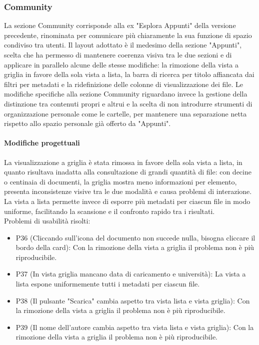 \subsubsection{Community}
La sezione Community corrisponde alla ex "Esplora Appunti" della versione
precedente, rinominata per comunicare più chiaramente la sua funzione di spazio condiviso tra utenti. Il layout adottato è il medesimo della sezione "Appunti", scelta che ha permesso di mantenere coerenza visiva tra le due sezioni e di applicare in parallelo alcune delle stesse modifiche: la rimozione della vista a griglia in favore della sola vista a lista, la barra di ricerca per titolo affiancata dai filtri per
metadati e la ridefinizione delle colonne di visualizzazione dei file. Le modifiche specifiche alla sezione Community riguardano invece la gestione della distinzione tra contenuti propri e altrui e la scelta di non introdurre strumenti di organizzazione personale come le cartelle, per mantenere una separazione netta rispetto allo spazio personale già offerto da "Appunti".

\paragraph{Modifiche progettuali}
La visualizzazione a griglia è stata rimossa in favore della sola vista a lista, in quanto risultava inadatta alla consultazione di grandi quantità di file: con decine o centinaia di documenti, la griglia mostra meno informazioni per elemento, presenta inconsistenze visive tra le due modalità e causa problemi di interazione. La vista a lista permette invece di esporre più metadati per ciascun file in modo uniforme, facilitando la scansione e il confronto rapido tra i risultati. \\

Problemi di usabilità risolti:
\begin{itemize}
  \item P36 (Cliccando sull'icona del documento non succede nulla, bisogna cliccare il bordo della card): Con la rimozione della vista a griglia il problema non è più riproducibile.
  \item P37 (In vista griglia mancano data di caricamento e università): La vista a lista espone uniformemente tutti i metadati per ciascun file.
  \item P38 (Il pulsante "Scarica" cambia aspetto tra vista lista e vista griglia): Con la rimozione della vista a griglia il problema non è più riproducibile.
  \item P39 (Il nome dell'autore cambia aspetto tra vista lista e vista griglia): Con la rimozione della vista a griglia il problema non è più riproducibile.
\end{itemize}

